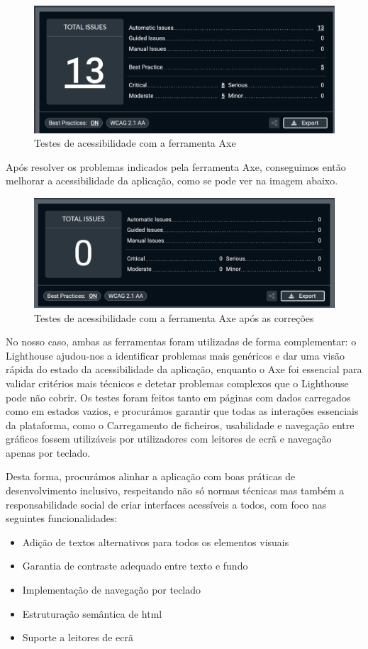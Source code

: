 \begin{figure}[H]
    \centering
    \includegraphics[max width=\textwidth]{./img/axe}
    \caption{Testes de acessibilidade com a ferramenta Axe}
    \end{figure}


Após resolver os problemas indicados pela ferramenta Axe, conseguimos então melhorar a acessibilidade da aplicação, como se pode ver na imagem abaixo.

\begin{figure}[H]
\centering
\includegraphics[max width=\textwidth]{./img/axe_after}
\caption{Testes de acessibilidade com a ferramenta Axe após as correções}
\end{figure}

No nosso caso, ambas as ferramentas foram utilizadas de forma complementar: o Lighthouse ajudou-nos a identificar problemas mais genéricos e dar uma visão rápida do estado da acessibilidade da aplicação, enquanto o Axe foi essencial para validar critérios mais técnicos e detetar problemas complexos que o Lighthouse pode não cobrir. Os testes foram feitos tanto em páginas com dados carregados como em estados vazios, e procurámos garantir que todas as interações essenciais da plataforma,  como o Carregamento de ficheiros, usabilidade e navegação entre gráficos fossem utilizáveis por utilizadores com leitores de ecrã e navegação apenas por teclado.

Desta forma, procurámos alinhar a aplicação com boas práticas de desenvolvimento inclusivo, respeitando não só normas técnicas mas também a responsabilidade social de criar interfaces acessíveis a todos, com foco nas seguintes funcionalidades:
\begin{itemize}
    \item Adição de textos alternativos para todos os elementos visuais
    \item Garantia de contraste adequado entre texto e fundo
    \item Implementação de navegação por teclado
    \item Estruturação semântica de \gls{html}
    \item Suporte a leitores de ecrã
\end{itemize}

